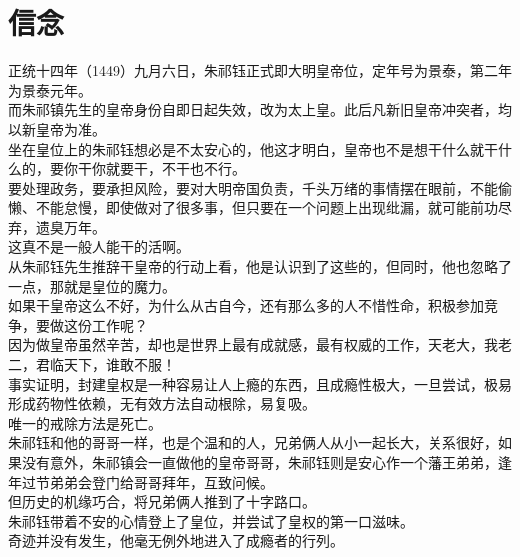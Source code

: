 \section{信念}
\ifnum{}
	\begin{multicols}{\theparacolNo}
\fi
正统十四年（1449）九月六日，朱祁钰正式即大明皇帝位，定年号为景泰，第二年为景泰元年。\\

而朱祁镇先生的皇帝身份自即日起失效，改为太上皇。此后凡新旧皇帝冲突者，均以新皇帝为准。\\

坐在皇位上的朱祁钰想必是不太安心的，他这才明白，皇帝也不是想干什么就干什么的，要你干你就要干，不干也不行。\\

要处理政务，要承担风险，要对大明帝国负责，千头万绪的事情摆在眼前，不能偷懒、不能怠慢，即使做对了很多事，但只要在一个问题上出现纰漏，就可能前功尽弃，遗臭万年。\\

这真不是一般人能干的活啊。\\

从朱祁钰先生推辞干皇帝的行动上看，他是认识到了这些的，但同时，他也忽略了一点，那就是皇位的魔力。\\

如果干皇帝这么不好，为什么从古自今，还有那么多的人不惜性命，积极参加竞争，要做这份工作呢？\\

因为做皇帝虽然辛苦，却也是世界上最有成就感，最有权威的工作，天老大，我老二，君临天下，谁敢不服！\\

事实证明，封建皇权是一种容易让人上瘾的东西，且成瘾性极大，一旦尝试，极易形成药物性依赖，无有效方法自动根除，易复吸。\\

唯一的戒除方法是死亡。\\

朱祁钰和他的哥哥一样，也是个温和的人，兄弟俩人从小一起长大，关系很好，如果没有意外，朱祁镇会一直做他的皇帝哥哥，朱祁钰则是安心作一个藩王弟弟，逢年过节弟弟会登门给哥哥拜年，互致问候。\\

但历史的机缘巧合，将兄弟俩人推到了十字路口。\\

朱祁钰带着不安的心情登上了皇位，并尝试了皇权的第一口滋味。\\

奇迹并没有发生，他毫无例外地进入了成瘾者的行列。\\


\end{multicols}
